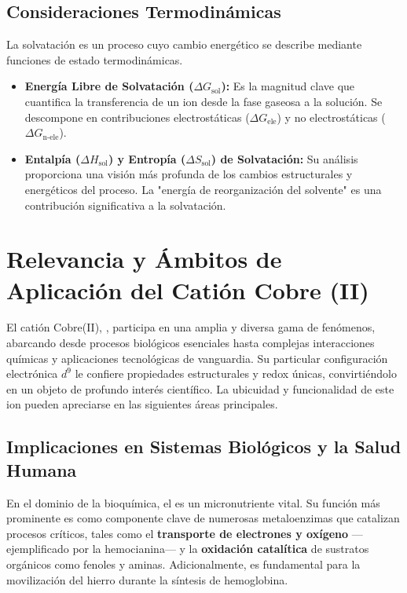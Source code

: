 \subsection{Consideraciones Termodinámicas}
La solvatación es un proceso cuyo cambio energético se describe mediante funciones de estado termodinámicas.
\begin{itemize}
    \item \textbf{Energía Libre de Solvatación ($\Delta G_{\text{sol}}$):} Es la magnitud clave que cuantifica la transferencia de un ion desde la fase gaseosa a la solución. Se descompone en contribuciones electrostáticas ($\Delta G_{\text{ele}}$) y no electrostáticas ($\Delta G_{\text{n-ele}}$).
    \item \textbf{Entalpía ($\Delta H_{\text{sol}}$) y Entropía ($\Delta S_{\text{sol}}$) de Solvatación:} Su análisis proporciona una visión más profunda de los cambios estructurales y energéticos del proceso. La "energía de reorganización del solvente" es una contribución significativa a la solvatación.
\end{itemize}



\section{Relevancia y Ámbitos de Aplicación del Catión Cobre (II)}

El catión Cobre(II), , participa en una amplia y diversa gama de fenómenos, abarcando desde procesos biológicos esenciales hasta complejas interacciones químicas y aplicaciones tecnológicas de vanguardia. Su particular configuración electrónica $d^9$ le confiere propiedades estructurales y redox únicas, convirtiéndolo en un objeto de profundo interés científico. La ubicuidad y funcionalidad de este ion pueden apreciarse en las siguientes áreas principales.


\subsection{Implicaciones en Sistemas Biológicos y la Salud Humana}

En el dominio de la bioquímica, el  es un micronutriente vital. Su función más prominente es como componente clave de numerosas metaloenzimas que catalizan procesos críticos, tales como el \textbf{transporte de electrones y oxígeno} —ejemplificado por la hemocianina— y la \textbf{oxidación catalítica} de sustratos orgánicos como fenoles y aminas. Adicionalmente, es fundamental para la movilización del hierro durante la síntesis de hemoglobina.

